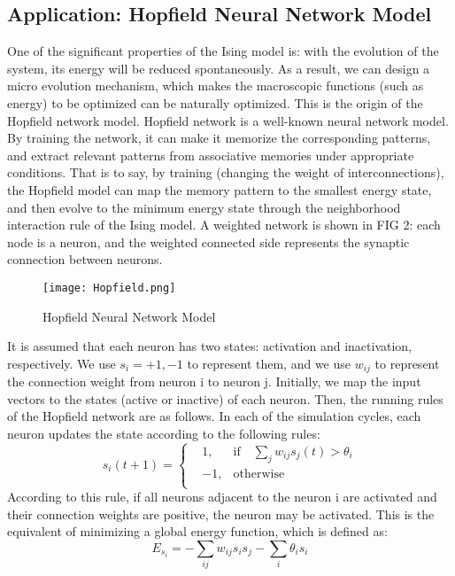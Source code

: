 \documentclass[prl,aps,twocolumn]{revtex4}
\begin{document}
    \subsection{Application: Hopfield Neural Network Model}
    \indent One of the significant properties of the Ising model is: with the evolution of the system, its energy will be reduced spontaneously. As a result, we can design a micro evolution mechanism, which makes the macroscopic functions (such as energy) to be optimized can be naturally optimized. This is the origin of the Hopfield network model.
    \indent Hopfield network is a well-known neural network model. By training the network, it can make it memorize the corresponding patterns, and extract relevant patterns from associative memories under appropriate conditions. That is to say, by training (changing the weight of interconnections), the Hopfield model can map the memory pattern to the smallest energy state, and then evolve to the minimum energy state through the neighborhood interaction rule of the Ising model. A weighted network is shown in FIG 2: each node is a neuron, and the weighted connected side represents the synaptic connection between neurons.
    \begin{figure}[htb]
      \texttt{[image: Hopfield.png]}
      \caption{Hopfield Neural Network Model}
      \label{fig:2}
    \end{figure}
    It is assumed that each neuron has two states: activation and inactivation, respectively. We use $s_i=+1, -1$ to represent them, and we use $w_{ij}$ to represent the connection weight from neuron i to neuron j. Initially, we map the input vectors to the states (active or inactive) of each neuron. Then, the running rules of the Hopfield network are as follows. In each of the simulation cycles, each neuron updates the state according to the following rules:
    \begin{equation}
        s_i(t+1)=\left\{
			\begin{aligned}
				& 1, & \text{if}\quad\sum_jw_{ij}s_j(t) >\theta_i \\
				& -1,& \text{otherwise} \\
			\end{aligned}
			\right.
    \end{equation}
    According to this rule, if all neurons adjacent to the neuron i are activated and their connection weights are positive, the neuron may be activated. This is the equivalent of minimizing a global energy function, which is defined as:
    \begin{equation}
      E_{{s_i}} = -\sum_{ij}w_{ij}s_is_j - \sum_i\theta_is_i
    \end{equation}
\end{document}
